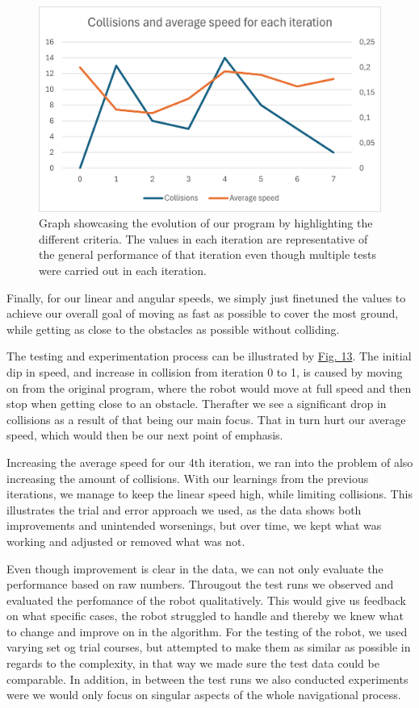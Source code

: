 \documentclass[conference]{IEEEtran}
\begin{document}
\begin{figure}[b]
    \centerline{\includegraphics[width=1.0\columnwidth]{Pictures/Graph.png}}
    \caption{Graph showcasing the evolution of our program by highlighting the different criteria. The values in each iteration are representative of the general performance of that iteration even though multiple tests were carried out in each iteration.}
    \label{sec:graph}
    \end{figure}

Finally, for our linear and angular speeds, we simply just finetuned the values to achieve our overall goal of moving as fast as possible to cover the most ground, while getting as close to the obstacles as possible without colliding.

The testing and experimentation process can be illustrated by \href{sec:graph}{Fig. 13}.
The initial dip in speed, and increase in collision from iteration 0 to 1, is caused by moving on from the original program, where the robot would move at full speed and then stop when getting close to an obstacle.
Therafter we see a significant drop in collisions as a result of that being our main focus.
That in turn hurt our average speed, which would then be our next point of emphasis.

Increasing the average speed for our 4th iteration, we ran into the problem of also increasing the amount of collisions.
With our learnings from the previous iterations, we manage to keep the linear speed high, while limiting collisions.
This illustrates the trial and error approach we used, as the data shows both improvements and unintended worsenings, but over time, we kept what was working and adjusted or removed what was not. 

Even though improvement is clear in the data, we can not only evaluate the performance based on raw numbers. 
Througout the test runs we observed and evaluated the perfomance of the robot qualitatively.
This would give us feedback on what specific cases, the robot struggled to handle and thereby we knew what to change and improve on in the algorithm.
For the testing of the robot, we used varying set og trial courses, but attempted to make them as similar as possible in regards to the complexity, in that way we made sure the test data could be comparable.
In addition, in between the test runs we also conducted experiments were we would only focus on singular aspects of the whole navigational process.
\end{document}
